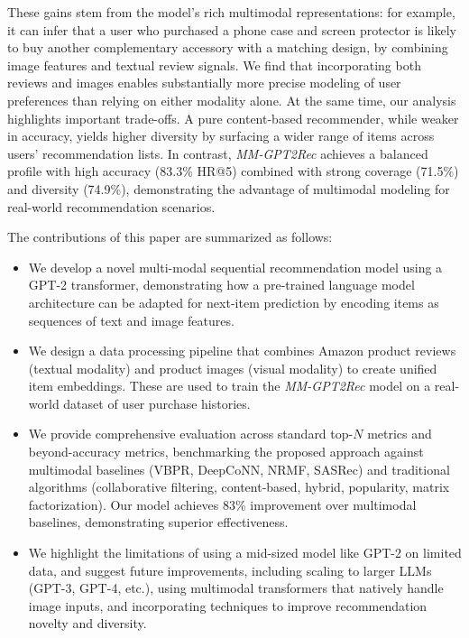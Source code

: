 \documentclass[conference]{IEEEtran}
\begin{document}
These gains stem from the model's rich multimodal representations: for example, it can infer that a user who purchased a phone case and screen protector is likely to buy another complementary accessory with a matching design, by combining image features and textual review signals. We find that incorporating both reviews and images enables substantially more precise modeling of user preferences than relying on either modality alone. At the same time, our analysis highlights important trade-offs. A pure content-based recommender, while weaker in accuracy, yields higher diversity by surfacing a wider range of items across users' recommendation lists. In contrast, \textit{MM-GPT2Rec} achieves a balanced profile with high accuracy (83.3\% HR@5) combined with strong coverage (71.5\%) and diversity (74.9\%), demonstrating the advantage of multimodal modeling for real-world recommendation scenarios.



The contributions of this paper are summarized as follows:
\begin{itemize}
    \item We develop a novel multi-modal sequential recommendation model using a GPT-2 transformer, demonstrating how a pre-trained language model architecture can be adapted for next-item prediction by encoding items as sequences of text and image features.

    \item  We design a data processing pipeline that combines Amazon product reviews (textual modality) and product images (visual modality) to create unified item embeddings. These are used to train the \textit{MM-GPT2Rec} model on a real-world dataset of user purchase histories.

    \item We provide comprehensive evaluation across standard top-$N$ metrics and beyond-accuracy metrics, benchmarking the proposed approach against multimodal baselines (VBPR, DeepCoNN, NRMF, SASRec) and traditional algorithms (collaborative filtering, content-based, hybrid, popularity, matrix factorization). Our model achieves 83\% improvement over multimodal baselines, demonstrating superior effectiveness.

    \item We highlight the limitations of using a mid-sized model like GPT-2 on limited data, and suggest future improvements, including scaling to larger LLMs (GPT-3, GPT-4, etc.), using multimodal transformers that natively handle image inputs, and incorporating techniques to improve recommendation novelty and diversity.

    
\end{itemize}
\end{document}
